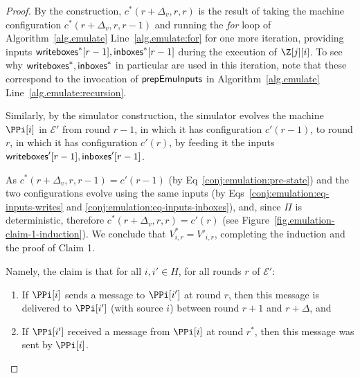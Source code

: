 \begin{proof}
  By the \rollerblade construction,
  $c^*(r + \Delta_v, r, r)$ is the result of
  taking the machine configuration
  $c^*(r + \Delta_v, r, r - 1)$
  and running the \emph{for} loop of Algorithm~\ref{alg.emulate} Line~\ref{alg.emulate:for}
  for one more iteration, providing inputs $\textsf{writeboxes}^*[r - 1], \textsf{inboxes}^*[r - 1]$
  during the execution of $\Z[j][i]$.
  To see why $\textsf{writeboxes}^*, \textsf{inboxes}^*$ in particular are used in this iteration,
  note that these correspond to the invocation of $\textsf{prepEmuInputs}$ in
  Algorithm~\ref{alg.emulate} Line~\ref{alg.emulate:recursion}.

  Similarly, by the simulator construction, %
  the simulator evolves the machine $\PPi[i]$ in $\mathcal{E}'$ from round $r - 1$,
  in which it has configuration $c'(r - 1)$,
  to round $r$,
  in which it has configuration $c'(r)$,
  by feeding it the inputs $\textsf{writeboxes}'[r - 1], \textsf{inboxes}'[r - 1]$.

  As $c^*(r + \Delta_v, r, r - 1) = c'(r - 1)$ (by Eq~\ref{conj:emulation:pre-state})
  and the two configurations evolve using the same inputs (by
  Eqs~\ref{conj:emulation:eq-inputs-writes} and \ref{conj:emulation:eq-inputs-inboxes}),
  and, since $\Pi$ is deterministic,
  therefore $c^*(r + \Delta_v, r, r) = c'(r)$ (see Figure~\ref{fig.emulation-claim-1-induction}).
  We conclude that $V^*_{i,r} = V'_{i,r}$, completing the induction
  and the proof of Claim 1.

  Namely, the claim is that for all $i, i' \in H$, for all rounds $r$ of $\mathcal{E}'$:

  \begin{enumerate}[label=(\alph*)]
    \item
    \label{conj:emulation:claim-delta-a}
    If $\PPi[i]$ sends a message to $\PPi[i']$ at round $r$, then this message is delivered to $\PPi[i']$
    (with source $i$) between round $r + 1$ and $r + \Delta$, and

    \item
    \label{conj:emulation:claim-delta-b}
    If $\PPi[i']$ received a message from $\PPi[i]$ at round $r^*$, then this message was sent by $\PPi[i]$.
  \end{enumerate}



\end{proof}

